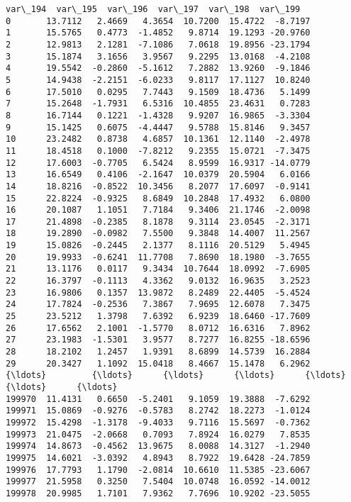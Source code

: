 \documentclass[11pt]{article}
\begin{document}
\begin{Verbatim}[commandchars=\\\{\}]
        var\_194  var\_195  var\_196  var\_197  var\_198  var\_199  
0       13.7112   2.4669   4.3654  10.7200  15.4722  -8.7197  
1       15.5765   0.4773  -1.4852   9.8714  19.1293 -20.9760  
2       12.9813   2.1281  -7.1086   7.0618  19.8956 -23.1794  
3       15.1874   3.1656   3.9567   9.2295  13.0168  -4.2108  
4       19.5542  -0.2860  -5.1612   7.2882  13.9260  -9.1846  
5       14.9438  -2.2151  -6.0233   9.8117  17.1127  10.8240  
6       17.5010   0.0295   7.7443   9.1509  18.4736   5.1499  
7       15.2648  -1.7931   6.5316  10.4855  23.4631   0.7283  
8       16.7144   0.1221  -1.4328   9.9207  16.9865  -3.3304  
9       15.1425   0.6075  -4.4447   9.5788  15.8146   9.3457  
10      23.2482   0.8738   4.6857  10.1361  12.1140  -2.4978  
11      18.4518   0.1000  -7.8212   9.2355  15.0721  -7.3475  
12      17.6003  -0.7705   6.5424   8.9599  16.9317 -14.0779  
13      16.6549   0.4106  -2.1647  10.0379  20.5904   6.0166  
14      18.8216  -0.8522  10.3456   8.2077  17.6097  -0.9141  
15      22.8224  -0.9325   8.6849  10.2848  17.4932   6.0800  
16      20.1087   1.1051   7.7184   9.3406  21.1746  -2.0098  
17      21.4898  -0.2385   8.1878   9.3114  23.0545  -2.3171  
18      19.2890  -0.0982   7.5500   9.3848  14.4007  11.2567  
19      15.0826  -0.2445   2.1377   8.1116  20.5129   5.4945  
20      19.9933  -0.6241  11.7708   7.8690  18.1980  -3.7655  
21      13.1176   0.0117   9.3434  10.7644  18.0992  -7.6905  
22      16.3797  -0.1113   4.3362   9.0132  16.9635   3.2523  
23      16.9806   0.1357  13.9872   8.2489  22.4405  -5.4524  
24      17.7824  -0.2536   7.3867   7.9695  12.6078   7.3475  
25      23.5212   1.3798   7.6392   6.9239  18.6460 -17.7609  
26      17.6562   2.1001  -1.5770   8.0712  16.6316   7.8962  
27      23.1983  -1.5301   3.9577   8.7277  16.8255 -18.6596  
28      18.2102   1.2457   1.9391   8.6899  14.5739  16.2884  
29      20.3427   1.1092  15.0418   8.4667  15.1478   6.2962  
{\ldots}         {\ldots}      {\ldots}      {\ldots}      {\ldots}      {\ldots}      {\ldots}  
199970  11.4131   0.6650  -5.2401   9.1059  19.3888  -7.6292  
199971  15.0869  -0.9276  -0.5783   8.2742  18.2273  -1.0124  
199972  15.4298  -1.3178  -9.4033   9.7116  15.5697  -0.7362  
199973  21.0475  -2.0668   0.7093   7.8924  16.0279   7.8535  
199974  14.8673  -0.4562  13.9675   8.0088  14.3127  -1.2940  
199975  14.6021  -3.0392   4.8943   8.7922  19.6428 -24.7859  
199976  17.7793   1.1790  -2.0814  10.6610  11.5385 -23.6067  
199977  21.5958   0.3250   7.5404  10.0748  16.0592 -14.0012  
199978  20.9985   1.7101   7.9362   7.7696  10.9202 -23.5055  

\end{Verbatim}
\end{document}
